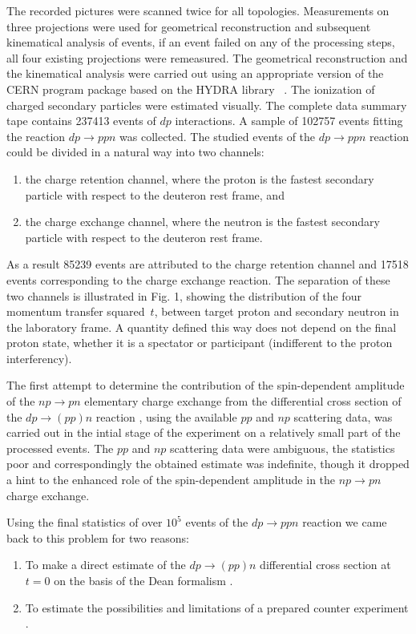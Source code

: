The recorded pictures were scanned twice for all topologies. Measurements on three
projections were used for  geometrical reconstruction and  subsequent
kinematical analysis of events, if an event failed on any of the processing
steps, all four existing projections were remeasured. The geometrical
 reconstruction and the kinematical analysis were carried out using
an appropriate version of the CERN program package based on the HYDRA
library ~\cite{hyd}.
The ionization of  charged secondary particles were estimated visually.
The complete data summary tape contains 237413 events of $dp$ interactions.
A sample of 102757 events fitting the reaction $dp\to ppn$ was collected.
The studied events of the  $dp\to ppn$ reaction  could
be divided in a natural way into two channels:\\
\begin{enumerate}
\item the charge retention channel, where the proton is the fastest
 secondary particle with respect to the deuteron rest frame, and
\item the charge exchange channel, where the neutron is the fastest
secondary particle with respect to the deuteron rest frame.
\end{enumerate}
As a result 85239 events are attributed to the charge retention channel
and 17518 events corresponding to the charge exchange reaction.
The separation of these two channels is illustrated in Fig. 1, showing
the distribution of the four momentum transfer squared~$t$, between target
proton and secondary neutron in the laboratory frame. A quantity
defined this way does not
depend on the final proton state, whether it is a spectator or participant
(indifferent to the proton interferency).

The first attempt to determine the contribution of the spin-dependent
amplitude of the $np\to pn$ elementary charge exchange from the differential
cross section of the $dp\to (pp)n$ reaction \cite{Ala}, using the available
$pp$ and $np$ scattering data, was carried out in the intial stage of the
experiment on a relatively small part of the processed events. The $pp$ and
$np$ scattering  data
were ambiguous, the statistics poor and correspondingly the obtained
estimate was indefinite, though it dropped a hint to the enhanced role
of the spin-dependent amplitude in the $np\to pn$ charge exchange.

Using the final statistics of over $10^{5}$ events of the $dp\to ppn$ reaction
we came back to this problem for two reasons:
\begin{enumerate}
\item To make a direct estimate of the $dp\to (pp)n$ differential cross section
at $t=0$ on the basis of the Dean formalism \cite{Dean1}.
\item To estimate the possibilities and limitations of a prepared counter
experiment \cite{Baz}.
\end{enumerate}

